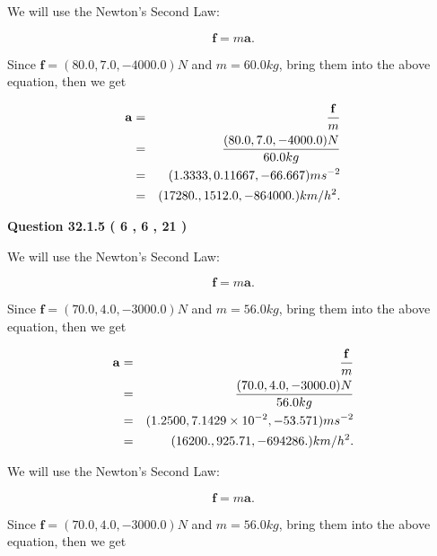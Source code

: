 \documentclass[12pt]{article}
\begin{document}
 
\noindent{}

We will use the Newton's Second Law:
 
\[
\mathbf{f}=m\mathbf{a}.
\]
 
Since $\mathbf{f}=( %
80.0,  %
7.0,  %
-4000.0 )N$
and $m= %
60.0 kg$, bring them into the above equation, then we get
 
\begin{eqnarray*}
\mathbf{a}&=&\frac{\mathbf{f}}m  \\
&=&\frac{(
80.0 ,
7.0 ,
-4000.0 )N
}{ %
60.0 kg}  \\
&=&(
1.3333 ,
0.11667,
-66.667
)ms^{-2} \\
&=&(
17280. ,
1512.0 ,
-864000.
)km/h^2.
\end{eqnarray*}
 
 
 
  
\vspace{0.2in}
  
{\textbf{\Large{Question
32.1.5 
 (           6 ,           6 ,          21 )
}}}
  
  
 
 
\noindent{}

We will use the Newton's Second Law:
 
\[
\mathbf{f}=m\mathbf{a}.
\]
 
Since $\mathbf{f}=( %
70.0,  %
4.0,  %
-3000.0 )N$
and $m= %
56.0 kg$, bring them into the above equation, then we get
 
\begin{eqnarray*}
\mathbf{a}&=&\frac{\mathbf{f}}m  \\
&=&\frac{(
70.0 ,
4.0 ,
-3000.0 )N
}{ %
56.0 kg}  \\
&=&(
1.2500 ,
7.1429 \times 10^{-2},
-53.571
)ms^{-2} \\
&=&(
16200. ,
925.71 ,
-694286.
)km/h^2.
\end{eqnarray*}
 
 
 
 
 
\noindent{}

We will use the Newton's Second Law:
 
\[
\mathbf{f}=m\mathbf{a}.
\]
 
Since $\mathbf{f}=( %
70.0,  %
4.0,  %
-3000.0 )N$
and $m= %
56.0 kg$, bring them into the above equation, then we get
 
\end{document}
